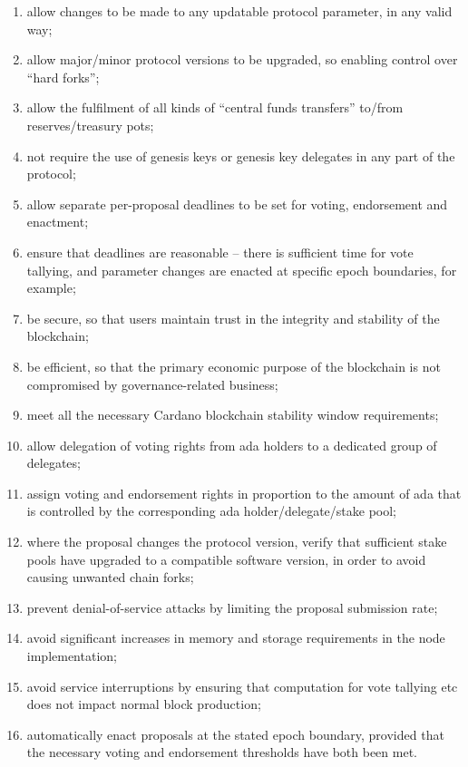 \begin{enumerate}
\item
  allow changes to be made to any updatable protocol parameter, in any valid way;
\item
  allow major/minor protocol versions to be upgraded, so enabling control over ``hard forks'';
\item
  allow the fulfilment of all kinds of ``central funds transfers'' to/from reserves/treasury pots;
\item
  not require the use of genesis keys or genesis key delegates in any part of the protocol;
\item
  allow separate per-proposal deadlines to be set for voting, endorsement and enactment;
\item
  ensure that deadlines are reasonable -- there is sufficient time for vote tallying, and parameter changes
  are enacted at specific epoch boundaries, for example;
\item
  be secure, so that users maintain trust in the integrity and stability of the blockchain;
\item
  be efficient, so that the primary economic purpose of the blockchain is not compromised by governance-related business;
\item
  meet all the necessary Cardano blockchain stability window requirements;
\item
  allow delegation of voting rights from ada holders to a dedicated group of delegates;
\item
  assign voting and endorsement rights in proportion to the amount of ada that is controlled by the corresponding ada holder/delegate/stake pool;
\item
  where the proposal changes the protocol version, verify that sufficient stake pools have upgraded to a compatible software version, in order to avoid causing unwanted chain forks;
\item
  prevent denial-of-service attacks by limiting the proposal submission rate;
\item
  avoid significant increases in memory and storage requirements in the node implementation;
\item
  avoid service interruptions by ensuring that computation for vote tallying etc does not impact normal block production;
\item
  automatically enact proposals at the stated epoch boundary, provided that the necessary voting and endorsement thresholds have both been met.
\end{enumerate}

